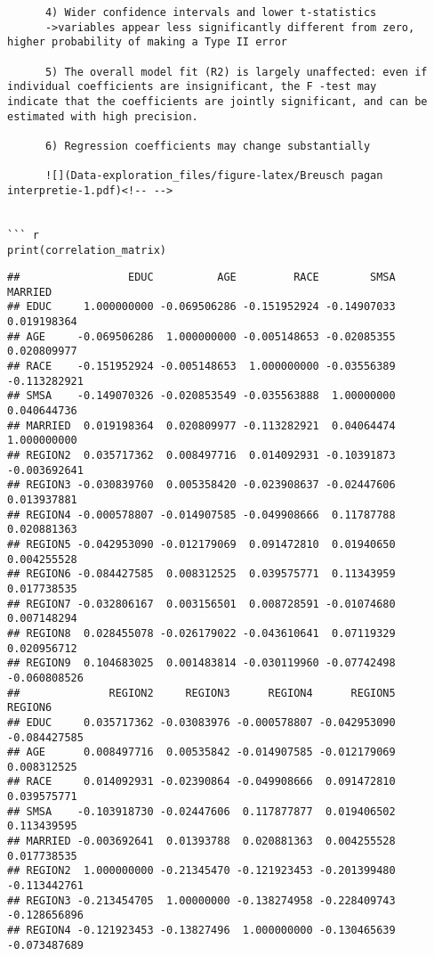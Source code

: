 \documentclass[
]{article}
\begin{document}
\begin{verbatim}
      4) Wider confidence intervals and lower t-statistics 
      ->variables appear less significantly different from zero, higher probability of making a Type II error

      5) The overall model fit (R2) is largely unaffected: even if individual coefficients are insignificant, the F -test may
indicate that the coefficients are jointly significant, and can be estimated with high precision.

      6) Regression coefficients may change substantially

      ![](Data-exploration_files/figure-latex/Breusch pagan interpretie-1.pdf)<!-- --> 


``` r
print(correlation_matrix)
\end{verbatim}

\begin{verbatim}
##                 EDUC          AGE         RACE        SMSA      MARRIED
## EDUC     1.000000000 -0.069506286 -0.151952924 -0.14907033  0.019198364
## AGE     -0.069506286  1.000000000 -0.005148653 -0.02085355  0.020809977
## RACE    -0.151952924 -0.005148653  1.000000000 -0.03556389 -0.113282921
## SMSA    -0.149070326 -0.020853549 -0.035563888  1.00000000  0.040644736
## MARRIED  0.019198364  0.020809977 -0.113282921  0.04064474  1.000000000
## REGION2  0.035717362  0.008497716  0.014092931 -0.10391873 -0.003692641
## REGION3 -0.030839760  0.005358420 -0.023908637 -0.02447606  0.013937881
## REGION4 -0.000578807 -0.014907585 -0.049908666  0.11787788  0.020881363
## REGION5 -0.042953090 -0.012179069  0.091472810  0.01940650  0.004255528
## REGION6 -0.084427585  0.008312525  0.039575771  0.11343959  0.017738535
## REGION7 -0.032806167  0.003156501  0.008728591 -0.01074680  0.007148294
## REGION8  0.028455078 -0.026179022 -0.043610641  0.07119329  0.020956712
## REGION9  0.104683025  0.001483814 -0.030119960 -0.07742498 -0.060808526
##              REGION2     REGION3      REGION4      REGION5      REGION6
## EDUC     0.035717362 -0.03083976 -0.000578807 -0.042953090 -0.084427585
## AGE      0.008497716  0.00535842 -0.014907585 -0.012179069  0.008312525
## RACE     0.014092931 -0.02390864 -0.049908666  0.091472810  0.039575771
## SMSA    -0.103918730 -0.02447606  0.117877877  0.019406502  0.113439595
## MARRIED -0.003692641  0.01393788  0.020881363  0.004255528  0.017738535
## REGION2  1.000000000 -0.21345470 -0.121923453 -0.201399480 -0.113442761
## REGION3 -0.213454705  1.00000000 -0.138274958 -0.228409743 -0.128656896
## REGION4 -0.121923453 -0.13827496  1.000000000 -0.130465639 -0.073487689

\end{verbatim}
\end{document}
